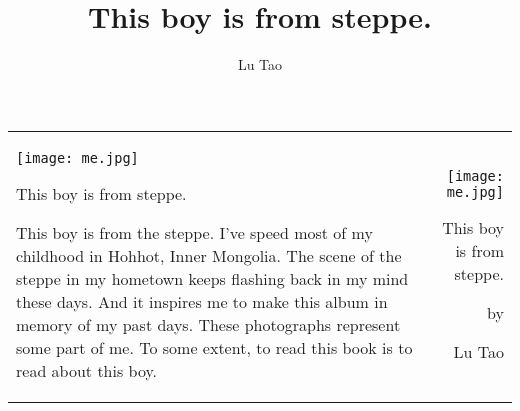 \documentclass[12pt]{article}
\title{This boy is from steppe.}
\author{Lu Tao}
\begin{document}
\pagestyle{empty}
\begin{tabular*}{\textwidth}[t]{l@{\extracolsep{\fill}}r}
\begin{minipage}[t]{8in}
\texttt{[image: me.jpg]}

\begin{center}
{\LARGE This boy is from steppe.}
\end{center}

\large{This boy is from the steppe.
I've speed most of my childhood in Hohhot, Inner Mongolia. 
The scene of the steppe in my hometown keeps flashing back in my mind these days.  And it inspires me to make this album in memory of my past days.
These photographs represent some part of me.
To some extent, to read this book is to read about this boy.}

\end{minipage}
&

\begin{minipage}[t]{8in}
\centering

\texttt{[image: me.jpg]}

\vspace*{0.1in}
{\huge This boy is from steppe.}

\vspace*{0.1in}
by

\vspace*{0.1in}
{\LARGE Lu Tao}
\end{minipage}

\\
\end{tabular*}
\end{document}
